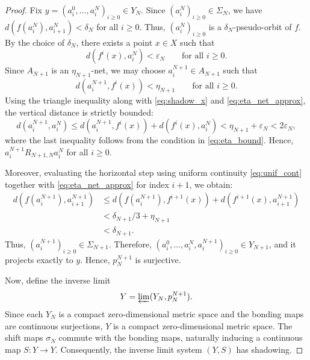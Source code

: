 \documentclass[12pt]{amsart}
\theoremstyle{definition}
\numberwithin{equation}{section}
\theoremstyle{remark}
\begin{document}
\begin{proof}
Fix $y = (a_i^0, \dots, a_i^N)_{i\geq 0} \in Y_N$. Since $(a_i^N)_{i\geq 0} \in \Sigma_N$, we have $d(f(a_i^N), a_{i+1}^N) < \delta_N$ for all $i \geq 0$. Thus, $(a_i^N)_{i\geq 0}$ is a $\delta_N$-pseudo-orbit of $f$. By the choice of $\delta_N$, there exists a point $x \in X$ such that
\begin{equation}\label{eq:shadow_x}
        d(f^i(x), a_i^N) < \varepsilon_N
        \qquad\text{for all } i \geq 0.
\end{equation}
Since $A_{N+1}$ is an $\eta_{N+1}$-net, we may choose $a_i^{N+1} \in A_{N+1}$ such that
\begin{equation}\label{eq:eta_net_approx}
        d(a_i^{N+1}, f^i(x)) < \eta_{N+1}
        \qquad\text{for all } i \geq 0.
\end{equation}
Using the triangle inequality along with \eqref{eq:shadow_x} and \eqref{eq:eta_net_approx}, the vertical distance is strictly bounded:
\[
        d(a_i^{N+1}, a_i^N)
        \leq
        d(a_i^{N+1}, f^i(x)) + d(f^i(x), a_i^N)
        <
        \eta_{N+1} + \varepsilon_N
        <
        2\varepsilon_N,
\]
where the last inequality follows from the condition in \eqref{eq:eta_bound}. Hence, $a_i^{N+1} \mathrel{R_{N+1,N}} a_i^N$ for all $i \geq 0$.

Moreover, evaluating the horizontal step using uniform continuity \eqref{eq:unif_cont} together with \eqref{eq:eta_net_approx} for index $i+1$, we obtain:
\[
\begin{aligned}
        d(f(a_i^{N+1}), a_{i+1}^{N+1})
        &\leq
        d(f(a_i^{N+1}), f^{i+1}(x)) + d(f^{i+1}(x), a_{i+1}^{N+1}) \\
        &<
        \delta_{N+1}/3 + \eta_{N+1} \\
        &<
        \delta_{N+1}.
\end{aligned}
\]
Thus, $(a_i^{N+1})_{i\geq 0} \in \Sigma_{N+1}$. Therefore, $(a_i^0, \dots, a_i^N, a_i^{N+1})_{i\geq 0} \in Y_{N+1}$, and it projects exactly to $y$. Hence, $p_N^{N+1}$ is surjective.

Now, define the inverse limit
\[
        Y = \varprojlim (Y_N, p_N^{N+1}).
\]
Since each $Y_N$ is a compact zero-dimensional metric space and the bonding maps are continuous surjections, $Y$ is a compact zero-dimensional metric space. The shift maps $\sigma_N$ commute with the bonding maps, naturally inducing a continuous map $S: Y \to Y$. Consequently, the inverse limit system $(Y,S)$ has shadowing.


\end{proof}
\end{document}
